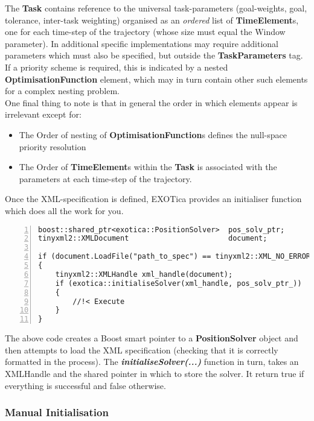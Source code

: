 \documentclass[12pt,a4paper,onecolumn]{article}
\begin{document}
\newline
\noindent The \textbf{Task} contains reference to the universal task-parameters (goal-weights, goal, tolerance, inter-task weighting) organised as an \textit{ordered} list of \textbf{TimeElement}s, one for each time-step of the trajectory (whose size must equal the Window parameter). In additional specific implementations may require additional parameters which must also be specified, but outside the \textbf{TaskParameters} tag.\\
\newline
\noindent If a priority scheme is required, this is indicated by a nested \textbf{OptimisationFunction} element, which may in turn contain other such elements for a complex nesting problem.\\
\newline
\noindent One final thing to note is that in general the order in which elements appear is irrelevant except for:
\begin{itemize}
\item The Order of nesting of \textbf{OptimisationFunction}s defines the null-space priority resolution
\item The Order of \textbf{TimeElement}s within the \textbf{Task} is associated with the parameters at each time-step of the trajectory.
\end{itemize}
\noindent Once the XML-specification is defined, EXOTica provides an initialiser function which does all the work for you.
\begin{lstlisting}[belowskip=-1.5 \baselineskip, numbers=left]
boost::shared_ptr<exotica::PositionSolver>  pos_solv_ptr;
tinyxml2::XMLDocument                       document;

if (document.LoadFile("path_to_spec") == tinyxml2::XML_NO_ERROR)
{
	tinyxml2::XMLHandle xml_handle(document);
	if (exotica::initialiseSolver(xml_handle, pos_solv_ptr_))
	{
		//!< Execute
	}
}
\end{lstlisting}
The above code creates a Boost smart pointer to a \textbf{PositionSolver} object and then attempts to load the XML specification (checking that it is correctly formatted in the process). The \textit{\textbf{initialiseSolver(...)}} function in turn, takes an XMLHandle and the shared pointer in which to store the solver. It return true if everything is successful and false otherwise.

\subsubsection*{Manual Initialisation}
\end{document}
